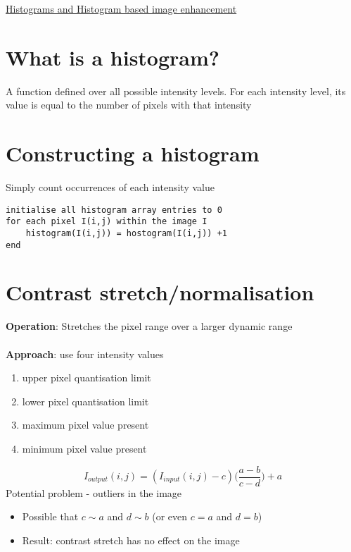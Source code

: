 \documentclass{article}[18pt]
\begin{document}
\begin{center}
\underline{\huge Histograms and Histogram based image enhancement}
\end{center}
\section{What is a histogram?}
\begin{defin}
A function defined over all possible intensity levels. For each intensity level, its value is equal to the number of pixels with that intensity
\end{defin}
\section{Constructing a histogram}
Simply count occurrences of each intensity value
\begin{lstlisting}[caption=Constructing a histogram]
initialise all histogram array entries to 0
for each pixel I(i,j) within the image I
	histogram(I(i,j)) = hostogram(I(i,j)) +1
end
\end{lstlisting}
\section{Contrast stretch/normalisation}
\textbf{Operation}: Stretches the pixel range over a larger dynamic range\\
\\
\textbf{Approach}: use four intensity values
\begin{enumerate}[label=\alph*:]
	\item upper pixel quantisation limit
	\item lower pixel quantisation limit
	\item maximum pixel value present
	\item minimum pixel value present
\end{enumerate}
$$I_{output}(i,j)=(I_{input}(i,j)-c)\Bigg(\dfrac{a-b}{c-d}\Bigg)+a$$
Potential problem - outliers in the image
\begin{itemize}
	\item Possible that $c\sim a$ and $d\sim b$ (or even $c=a$ and $d=b$)
	\item Result: contrast stretch has no effect on the image
\end{itemize}
\end{document}
